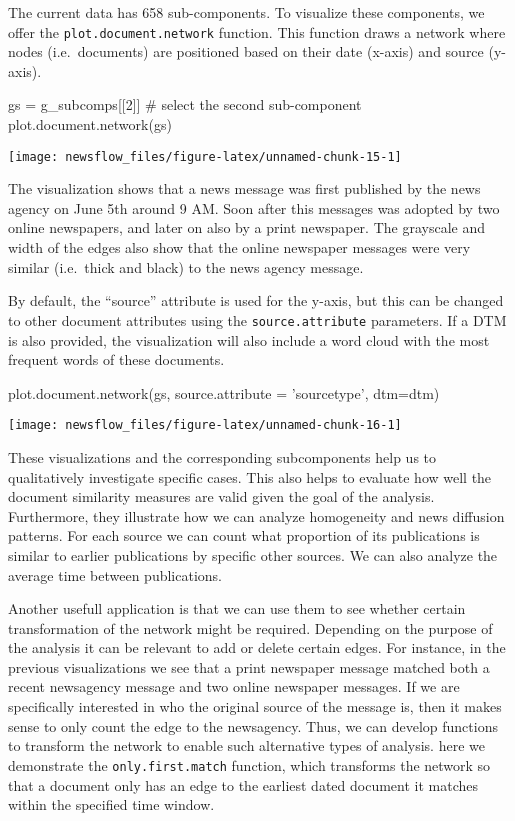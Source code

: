 The current data has 658 sub-components. To visualize these components,
we offer the \texttt{plot.document.network} function. This function
draws a network where nodes (i.e.~documents) are positioned based on
their date (x-axis) and source (y-axis).

\begin{Schunk}
\begin{Sinput}
gs = g_subcomps[[2]] # select the second sub-component
plot.document.network(gs)
\end{Sinput}

\texttt{[image: newsflow\_files/figure-latex/unnamed-chunk-15-1]} \end{Schunk}

The visualization shows that a news message was first published by the
news agency on June 5th around 9 AM. Soon after this messages was
adopted by two online newspapers, and later on also by a print
newspaper. The grayscale and width of the edges also show that the
online newspaper messages were very similar (i.e.~thick and black) to
the news agency message.

By default, the ``source'' attribute is used for the y-axis, but this
can be changed to other document attributes using the
\texttt{source.attribute} parameters. If a DTM is also provided, the
visualization will also include a word cloud with the most frequent
words of these documents.

\begin{Schunk}
\begin{Sinput}
plot.document.network(gs, source.attribute = 'sourcetype', dtm=dtm)
\end{Sinput}

\texttt{[image: newsflow\_files/figure-latex/unnamed-chunk-16-1]} \end{Schunk}

These visualizations and the corresponding subcomponents help us to
qualitatively investigate specific cases. This also helps to evaluate
how well the document similarity measures are valid given the goal of
the analysis. Furthermore, they illustrate how we can analyze
homogeneity and news diffusion patterns. For each source we can count
what proportion of its publications is similar to earlier publications
by specific other sources. We can also analyze the average time between
publications.

Another usefull application is that we can use them to see whether
certain transformation of the network might be required. Depending on
the purpose of the analysis it can be relevant to add or delete certain
edges. For instance, in the previous visualizations we see that a print
newspaper message matched both a recent newsagency message and two
online newspaper messages. If we are specifically interested in who the
original source of the message is, then it makes sense to only count the
edge to the newsagency. Thus, we can develop functions to transform the
network to enable such alternative types of analysis. here we
demonstrate the \texttt{only.first.match} function, which transforms the
network so that a document only has an edge to the earliest dated
document it matches within the specified time window.

